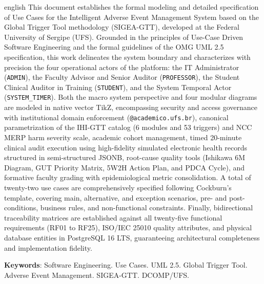 \begin{resumo}[Abstract]
\begin{otherlanguage*}{english}
This document establishes the formal modeling and detailed specification of Use Cases for the Intelligent Adverse Event Management System based on the Global Trigger Tool methodology (SIGEA-GTT), developed at the Federal University of Sergipe (UFS). Grounded in the principles of Use-Case Driven Software Engineering and the formal guidelines of the OMG UML 2.5 specification, this work delineates the system boundary and characterizes with precision the four operational actors of the platform: the IT Administrator (\texttt{ADMIN}), the Faculty Advisor and Senior Auditor (\texttt{PROFESSOR}), the Student Clinical Auditor in Training (\texttt{STUDENT}), and the System Temporal Actor (\texttt{SYSTEM\_TIMER}). Both the macro system perspective and four modular diagrams are modeled in native vector TikZ, encompassing security and access governance with institutional domain enforcement (\texttt{@academico.ufs.br}), canonical parametrization of the IHI-GTT catalog (6 modules and 53 triggers) and NCC MERP harm severity scale, academic cohort management, timed 20-minute clinical audit execution using high-fidelity simulated electronic health records structured in semi-structured JSONB, root-cause quality tools (Ishikawa 6M Diagram, GUT Priority Matrix, 5W2H Action Plan, and PDCA Cycle), and formative faculty grading with epidemiological metric consolidation. A total of twenty-two use cases are comprehensively specified following Cockburn's template, covering main, alternative, and exception scenarios, pre- and post-conditions, business rules, and non-functional constraints. Finally, bidirectional traceability matrices are established against all twenty-five functional requirements (RF01 to RF25), ISO/IEC 25010 quality attributes, and physical database entities in PostgreSQL 16 LTS, guaranteeing architectural completeness and implementation fidelity.

\vspace{\onelineskip}
\noindent
\textbf{Keywords}: Software Engineering. Use Cases. UML 2.5. Global Trigger Tool. Adverse Event Management. SIGEA-GTT. DCOMP/UFS.
\end{otherlanguage*}
\end{resumo}
